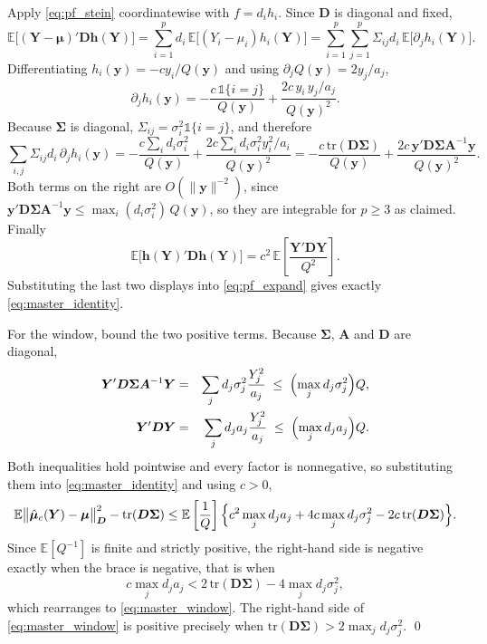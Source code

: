 \documentclass[a4paper,fleqn]{cas-sc}
\theoremstyle{plain}
\theoremstyle{definition}
\theoremstyle{remark}
\newcommand{\tr}{\mathrm{tr}}
\newcommand{\E}{\mathbb{E}}
\begin{document}
\begin{appendices}
Apply \eqref{eq:pf_stein} coordinatewise with $f=d_ih_i$. Since $\bm D$ is diagonal and fixed,
\begin{equation}
\E\bigl[(\bm Y-\bm\mu)'\bm D\bm h(\bm Y)\bigr]
=
\sum_{i=1}^{p}d_i\,\E\bigl[(Y_i-\mu_i)h_i(\bm Y)\bigr]
=
\sum_{i=1}^{p}\sum_{j=1}^{p}\Sigma_{ij}d_i\,\E\bigl[\partial_jh_i(\bm Y)\bigr].
\end{equation}
Differentiating $h_i(\bm y)=-cy_i/Q(\bm y)$ and using $\partial_jQ(\bm y)=2y_j/a_j$,
\begin{equation}
\partial_jh_i(\bm y)
=
-\frac{c\,\mathbb 1\{i=j\}}{Q(\bm y)}
+\frac{2c\,y_i\,y_j/a_j}{Q(\bm y)^{2}} .
\end{equation}
Because $\bm\Sigma$ is diagonal, $\Sigma_{ij}=\sigma^2_i\mathbb 1\{i=j\}$, and therefore
\begin{equation}
\label{eq:pf_stein_sum}
\sum_{i,j}\Sigma_{ij}d_i\,\partial_jh_i(\bm y)
=
-\frac{c\sum_{i}d_i\sigma^2_i}{Q(\bm y)}
+\frac{2c\sum_{i}d_i\sigma^2_iy^2_i/a_i}{Q(\bm y)^{2}}
=
-\frac{c\,\tr(\bm D\bm\Sigma)}{Q(\bm y)}
+\frac{2c\,\bm y'\bm D\bm\Sigma\bm A^{-1}\bm y}{Q(\bm y)^{2}} .
\end{equation}
Both terms on the right are $O(\|\bm y\|^{-2})$, since $\bm y'\bm D\bm\Sigma\bm A^{-1}\bm y\le\max_i(d_i\sigma^2_i)\,Q(\bm y)$, so they are integrable for $p\ge3$ as claimed. Finally
\begin{equation}
\E\bigl[\bm h(\bm Y)'\bm D\bm h(\bm Y)\bigr]
=
c^{2}\,\E\left[\frac{\bm Y'\bm D\bm Y}{Q^{2}}\right].
\end{equation}
Substituting the last two displays into \eqref{eq:pf_expand} gives exactly \eqref{eq:master_identity}.

For the window, bound the two positive terms. Because $\bm\Sigma$, $\bm A$ and $\bm D$ are diagonal,
\begin{eqnarray}
\bm Y'\bm D\bm\Sigma\bm A^{-1}\bm Y
&=&
\sum_{j}d_j\sigma^2_j\frac{Y^2_j}{a_j}
\;\le\;
\Bigl(\max_{j}d_j\sigma^2_j\Bigr)Q,
\cr
\bm Y'\bm D\bm Y
&=&
\sum_{j}d_ja_j\frac{Y^2_j}{a_j}
\;\le\;
\Bigl(\max_{j}d_ja_j\Bigr)Q .
\end{eqnarray}
Both inequalities hold pointwise and every factor is nonnegative, so substituting them into \eqref{eq:master_identity} and using $c>0$,
\begin{equation}
\label{eq:pf_window}
\E\bigl\|\hat{\bm\mu}_c(\bm Y)-\bm\mu\bigr\|^2_{\bm D}-\tr(\bm D\bm\Sigma)
\le
\E\left[\frac{1}{Q}\right]
\Bigl\{
c^{2}\max_{j}d_ja_j
+4c\max_{j}d_j\sigma^2_j
-2c\,\tr(\bm D\bm\Sigma)
\Bigr\}.
\end{equation}
Since $\E[Q^{-1}]$ is finite and strictly positive, the right-hand side is negative exactly when the brace is negative, that is when
\begin{equation}
c\max_{j}d_ja_j<2\,\tr(\bm D\bm\Sigma)-4\max_{j}d_j\sigma^2_j ,
\end{equation}
which rearranges to \eqref{eq:master_window}. The right-hand side of \eqref{eq:master_window} is positive precisely when $\tr(\bm D\bm\Sigma)>2\max_jd_j\sigma^2_j$. \qed


\end{appendices}
\end{document}
